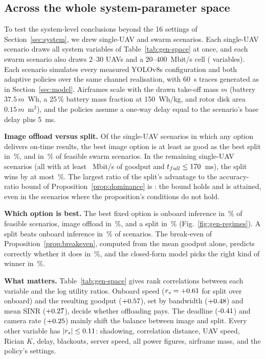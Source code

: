 \documentclass[journal,twocolumn,10pt]{IEEEtran}
\begin{document}
\subsection{Across the whole system-parameter space}\label{sec:gen-mc}
To test the system-level conclusions beyond the 16 settings of Section~\ref{sec:system}, we drew \GenNScenarios{} single-UAV and \GenNSwarmScenarios{} swarm scenarios. Each single-UAV scenario draws all \GenNVariablesSingle{} system variables of Table~\ref{tab:gen-space} at once, and each swarm scenario also draws 2--30 UAVs and a 20--400~Mbit/s cell (\GenNVariables{} variables). Each scenario simulates every measured YOLOv8s configuration and both adaptive policies over the same channel realisation, with 60~s traces generated as in Section~\ref{sec:model}. Airframes scale with the drawn take-off mass $m$ (battery $37.5\,m$~Wh, a 25\,\% battery mass fraction at 150~Wh/kg, and rotor disk area $0.15\,m$~m$^2$), and the policies assume a one-way delay equal to the scenario's base delay plus 5~ms.

\textbf{Image offload versus split.} Of the \GenFeasible{} single-UAV scenarios in which any option delivers on-time results, the best image option is at least as good as the best split in \GenCodecBeatsSplitPct\,\%, and in \GenSwarmCodecBeatsSplitPct\,\% of feasible swarm scenarios. In the remaining \GenSplitWinsN{} single-UAV scenarios (all with at least \GenSplitWinMinGoodput~Mbit/s of goodput and $t_{full}\le170$~ms), the split wins by at most \GenMaxSplitGainPct\,\%. The largest ratio of the split's advantage to the accuracy-ratio bound of Proposition~\ref{prop:dominance} is \GenBoundRatioMax: the bound holds and is attained, even in the scenarios where the proposition's conditions do not hold.

\textbf{Which option is best.} The best fixed option is onboard inference in \GenOracleOnboardPct\,\% of feasible scenarios, image offload in \GenOracleCodecPct\,\%, and a split in \GenOracleSplitPct\,\% (Fig.~\ref{fig:gen-regimes}). A split beats onboard inference in \GenSplitBeatsOnboardPct\,\% of scenarios. The break-even of Proposition~\ref{prop:breakeven}, computed from the mean goodput alone, predicts correctly whether it does in \GenBreakEvenAccPct\,\%, and the closed-form model picks the right kind of winner in \GenAnalyticAgreePct\,\%.

\textbf{What matters.} Table~\ref{tab:gen-space} gives rank correlations between each variable and the log utility ratios. Onboard speed ($r_s=+0.61$ for split over onboard) and the resulting goodput ($+0.57$), set by bandwidth ($+0.48$) and mean SINR ($+0.27$), decide whether offloading pays. The deadline ($\GenRhoDeadlineCodec$) and camera rate ($+0.25$) mainly shift the balance between image and split. Every other variable has $|r_s|\le0.11$: shadowing, correlation distance, UAV speed, Rician $K$, delay, blackouts, server speed, all power figures, airframe mass, and the policy's settings.
\end{document}
